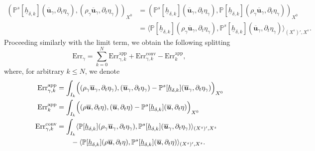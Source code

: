 \documentclass[10pt]{amsart}
\newcommand{\app}{\mathrm{app}}
\newcommand{\conv}{\mathrm{conv}}
\newcommand{\Err}{\mathrm{Err}}
\theoremstyle{remark}
\theoremstyle{definition}
\newcommand{\ug}{\boldsymbol{u}}
\newcommand{\hb}{{\underline{h}}}
\begin{document}
\begin{align*}
( \mathbb{P}^{s}[\hb_{\delta, k}](\overline{\ug}_{\gamma},\partial_{t}\eta_{\gamma}),(\rho_{\gamma} \overline{\ug}_{\gamma},\partial_t \eta_{\gamma}))_{X^0}
& \!=\! ( \mathbb{P}^{s}[\hb_{\delta, k}](\overline{\ug}_{\gamma},\partial_{t}\eta_{\gamma}),\mathbb P[\hb_{\delta,k}](\rho_{\gamma} \overline{\ug}_{\gamma},\partial_t \eta_{\gamma}))_{X^0} \\
& \!=\! \langle \mathbb P[\hb_{\delta,k}](\rho_{\gamma} \overline{\ug}_{\gamma},\partial_t \eta_{\gamma}), \mathbb{P}^{s}[\hb_{\delta, k}](\overline{\ug}_{\gamma},\partial_{t}\eta_{\gamma}) \rangle_{(X^s)',X^s}.
\end{align*}
Proceeding similarly with the limit term, we obtain the following splitting
\[
\Err_{\gamma} = \sum_{k=0}^N \Err^{\app}_{\gamma,k} + \Err^{\conv}_{\gamma,k} - \Err^{\app}_{k},
\]
where, for arbitrary $k \leq N$, we denote
\begin{align*}
\Err^{\app}_{\gamma,k} & = \int_{I_{k}} \Bigl( (\rho_{\gamma} \overline{\ug}_{\gamma},\partial_t \eta_{\gamma}),( \overline{\ug}_{\gamma},\partial_t \eta_{\gamma})- \mathbb{P}^{s}[\hb_{\delta, k}](\overline{\ug}_{\gamma},\partial_{t}\eta_{\gamma})\Bigr)_{X^0} \\
\Err^{\app}_{k} &= \int_{I_{k}} \Bigl( (\rho \overline{\ug},\partial_t \eta),( \overline{\ug},\partial_t \eta)- \mathbb{P}^{s}[\hb_{\delta, k}](\overline{\ug},\partial_{t}\eta)\Bigr)_{X^0}\\
\Err^{\conv}_{\gamma,k} &= \int_{I_k} \langle \mathbb P[\hb_{\delta,k}](\rho_{\gamma} \overline{\ug}_{\gamma},\partial_t \eta_{\gamma}), \mathbb{P}^{s}[\hb_{\delta, k}](\overline{\ug}_{\gamma},\partial_{t}\eta_{\gamma}) \rangle_{(X^s)',X^s} \\
& \qquad
- \langle \mathbb P[\hb_{\delta,k}](\rho \overline{\ug},\partial_t \eta), \mathbb{P}^{s}[\hb_{\delta, k}](\overline{\ug},\partial_{t}\eta) \rangle_{(X^s)',X^s}.
\end{align*}
\end{document}
